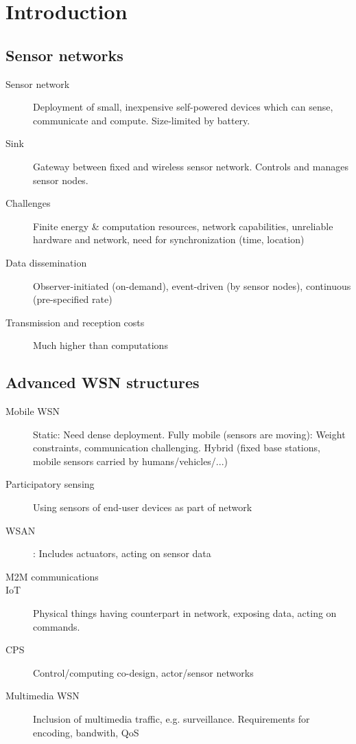 \section{Introduction}

\subsection{Sensor networks}

\begin{description}
		\item[Sensor network] Deployment of small, inexpensive self-powered
				devices which can sense, communicate and compute. Size-limited
				by battery.
		\item[Sink] Gateway between fixed and wireless sensor network. Controls
				and manages sensor nodes.
		\item[Challenges] Finite energy \& computation resources, network
				capabilities, unreliable hardware and network, need for
				synchronization (time, location)
		\item[Data dissemination] Observer-initiated (on-demand), event-driven
				(by sensor nodes), continuous (pre-specified rate)
		\item[Transmission and reception costs] Much higher than computations
\end{description}

\subsection{Advanced WSN structures}

\begin{description}
		\item[Mobile WSN] Static: Need dense deployment. Fully mobile
				(sensors are moving): Weight constraints, communication
				challenging. Hybrid (fixed base stations, mobile sensors
				carried by humans/vehicles/...)
		\item[Participatory sensing] Using sensors of end-user devices as part
				of network
		\item[WSAN]: Includes actuators, acting on sensor data
		\item[M2M communications]
		\item[IoT] Physical things having counterpart in network, exposing
				data, acting on commands.
		\item[CPS] Control/computing co-design, actor/sensor networks
		\item[Multimedia WSN] Inclusion of multimedia traffic, e.g.
				surveillance. Requirements for encoding, bandwith, QoS
\end{description}


